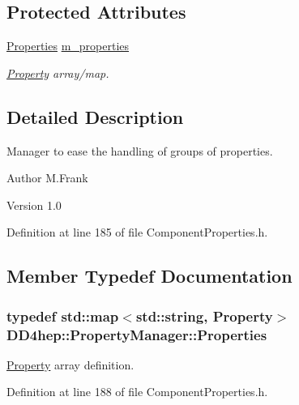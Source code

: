 \subsection*{Protected Attributes}
\begin{DoxyCompactItemize}
\item 
\hyperlink{class_d_d4hep_1_1_property_manager_af9bc1c909d5489219e0f9e97b16dab6f}{Properties} \hyperlink{class_d_d4hep_1_1_property_manager_af966b46276f15f24b36f7e88006bd098}{m\_\-properties}
\begin{DoxyCompactList}\small\item\em \hyperlink{class_d_d4hep_1_1_property}{Property} array/map. \item\end{DoxyCompactList}\end{DoxyCompactItemize}


\subsection{Detailed Description}
Manager to ease the handling of groups of properties. \begin{DoxyAuthor}{Author}
M.Frank 
\end{DoxyAuthor}
\begin{DoxyVersion}{Version}
1.0 
\end{DoxyVersion}


Definition at line 185 of file ComponentProperties.h.

\subsection{Member Typedef Documentation}
\hypertarget{class_d_d4hep_1_1_property_manager_af9bc1c909d5489219e0f9e97b16dab6f}{
\subsubsection[{Properties}]{\setlength{\rightskip}{0pt plus 5cm}typedef std::map$<$std::string, {\bf Property}$>$ {\bf DD4hep::PropertyManager::Properties}}}
\label{class_d_d4hep_1_1_property_manager_af9bc1c909d5489219e0f9e97b16dab6f}


\hyperlink{class_d_d4hep_1_1_property}{Property} array definition. 

Definition at line 188 of file ComponentProperties.h.

